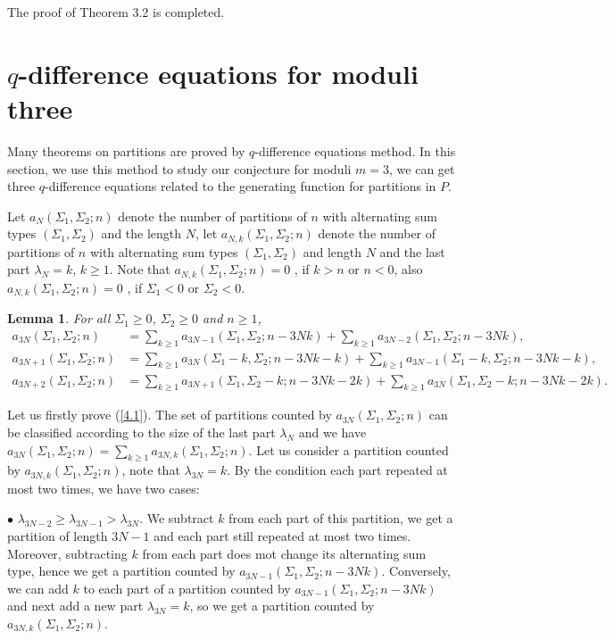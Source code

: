 \documentclass[draft]{amsart}
\numberwithin{equation}{section}
\theoremstyle{plain}
\newtheorem{lemma}[theorem]{Lemma}
\theoremstyle{remark}
\begin{document}
The proof of Theorem 3.2 is completed.




\section{$q$-difference equations for moduli three }
Many theorems on partitions are proved by $q$-difference equations method. In this section, we use this method to study our conjecture  for moduli $m=3$, we can get three $q$-difference equations related to the generating function for partitions in $P$. 

Let $a_{N}(\Sigma_{1},  \Sigma_{2};  n)$ denote the number of partitions of $n$ with alternating sum types $(\Sigma_{1}, \Sigma_{2})$ and the length $N$,  let $a_{N,k}(\Sigma_{1}, \Sigma_{2}; n)$ denote the number of partitions of $n$ with alternating sum types $(\Sigma_{1}, \Sigma_{2})$ and length  $N$ and the last part $\lambda_{N}=k$, $k\geq 1$. Note that $a_{N,k}(\Sigma_{1}, \Sigma_{2}; n)=0$ , if $k>n$ or $n<0$, also $a_{N,k}(\Sigma_{1}, \Sigma_{2}; n)=0$ , if $\Sigma_{1}<0$ or $\Sigma_{2}<0$. 
\begin{lemma}
For all $\Sigma_{1}\geq 0$, $\Sigma_{2}\geq 0$ and $n\geq 1$,
\begin{align}
a_{3N}(\Sigma_{1}, \Sigma_{2}; n)&=\sum_{k\geq 1}a_{3N-1}(\Sigma_{1}, \Sigma_{2}; n-3Nk) +\sum_{k\geq 1}a_{3N-2}(\Sigma_{1}, \Sigma_{2}; n-3Nk),\label{4.1}\\
a_{3N+1}(\Sigma_{1}, \Sigma_{2}; n)&=\sum_{k\geq 1}a_{3N}(\Sigma_{1}-k, \Sigma_{2}; n-3Nk-k) +\sum_{k\geq 1}a_{3N-1}(\Sigma_{1}-k, \Sigma_{2}; n-3Nk-k),\label{4.2}\\
a_{3N+2}(\Sigma_{1}, \Sigma_{2}; n)&=\sum_{k\geq 1}a_{3N+1}(\Sigma_{1}, \Sigma_{2}-k; n-3Nk-2k) +\sum_{k\geq 1}a_{3N}(\Sigma_{1}, \Sigma_{2}-k; n-3Nk-2k).\label{4.3}
\end{align}
\end{lemma}

 Let us firstly prove (\ref{4.1}). The set of partitions counted by $a_{3N}(\Sigma_{1}, \Sigma_{2}; n)$ can be classified according to the size of the last part $\lambda_{N}$ and we have $a_{3N}(\Sigma_{1}, \Sigma_{2}; n)=\sum_{k\geq 1} a_{3N, k}(\Sigma_{1},\Sigma_{2}; n)$. Let us consider a partition counted by $a_{3N,k}(\Sigma_{1},\Sigma_{2};  n)$, note that $\lambda_{3N}=k$.   By the condition each part repeated at most two times, we have two cases:

$\bullet$  $\lambda_{3N-2}\geq \lambda_{3N-1}>\lambda_{3N}.$  We subtract $k$ from each part of this partition, we get a partition of length $3N-1$ and each part still repeated at most two times. Moreover, subtracting $k$ from each part does mot change its alternating sum type,  hence we get a partition counted by $a_{3N-1}(\Sigma_{1}, \Sigma_{2}; n-3Nk)$.
Conversely, we can add $k$ to each part of a partition counted by $a_{3N-1}(\Sigma_{1},\Sigma_{2}; n-3Nk)$ and next add a new part $\lambda_{3N}=k$, so we get a partition counted by $a_{3N,k}(\Sigma_{1}, \Sigma_{2}; n)$. 
\end{document}
